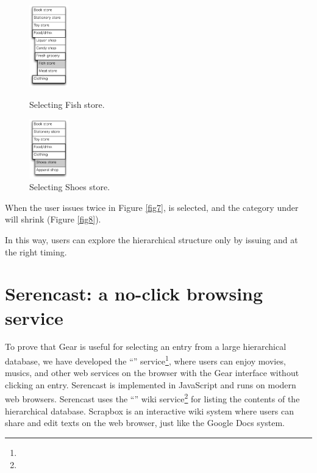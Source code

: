\documentclass[conference]{IEEEtran}
\def\up{\tsf{▲}}
\def\down{\tsf{▼}}
\def\SC{Serencast}
\def\SB{Scrapbox}
\begin{document}
\begin{figure}[H]
  \begin{minipage}{0.45\hsize}
    \centerline{\includegraphics[width=17mm,bb=0 0 139 292]{figures/fig7.pdf}}
    \caption{Selecting Fish store.}
    \label{fig7}
  \end{minipage}
  \begin{minipage}{0.45\hsize}
    \centerline{\includegraphics[width=17mm,bb=0 0 139 211]{figures/fig9.pdf}}
    \caption{Selecting Shoes store.}
    \label{fig9}
  \end{minipage}
\end{figure}

When the user issues {\down} twice in Figure \ref{fig7},
 is selected, and the category under  will shrink (Figure \ref{fig8}).

In this way, users can explore the hierarchical structure
only by issuing {\up} and {\down} at the right timing.

\section{Serencast: a no-click browsing service}

To prove that Gear is useful for selecting an entry from a
large hierarchical database,
we have developed the ``\tsf{\SC}'' service\footnote{
}, where users can enjoy movies, musics, and other web services
on the browser with the Gear interface without clicking an entry.
{\SC} is implemented in JavaScript and runs on modern web browsers.
%
{\SC} uses the ``\tsf{\SB}'' wiki service\footnote{
} for listing the contents of the hierarchical database.
{\SB} is an interactive wiki
system where users can share and edit texts on the web browser,
just like the Google Docs system.
\end{document}
